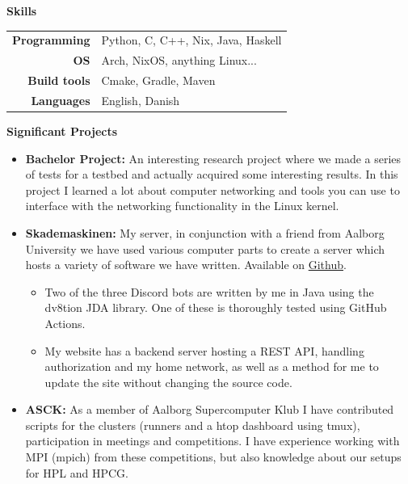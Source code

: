 \documentclass[a4paper, 14pt]{article}
\newcommand{\myitem}[1]{\item[\color{myorange}$\circ$]#1}
\newcommand{\newcvsection}[2]{
    \noindent\huge \textbf{#1} \color{myorange}\hrulefill\color{black}
    
    \normalsize
    #2    
    \vspace{.5cm}
}
\begin{document}
    \newcvsection{Skills}{
        \begin{table}[H]
            \begin{tabular}{rl}
                \textbf{Programming} & Python, C, C++, Nix, Java, Haskell\\
                \textbf{OS} & Arch, NixOS, anything Linux... \\
                \textbf{Build tools} & Cmake, Gradle, Maven \\
                \textbf{Languages} & English, Danish
            \end{tabular}
        \end{table}
    }

    \newcvsection{Significant Projects}{
        \begin{itemize}
            \myitem{
                \textbf{Bachelor Project: } An interesting research project where we made a series of tests for a testbed and actually acquired some interesting results. 
                In this project I learned a lot about computer networking and tools you can use to interface with the networking functionality in the Linux kernel.
            }
            \myitem{
                \textbf{Skademaskinen: } My server, in conjunction with a friend from Aalborg University we have used various computer parts to create a server which hosts a variety of software we have written.
                Available on \href{https://github.com/Skademaskinen}{Github}.
                \begin{itemize}
                    \myitem{
                        Two of the three Discord bots are written by me in Java using the dv8tion JDA library. One of these is thoroughly tested using GitHub Actions.
                    }
                    \myitem{
                        My website has a backend server hosting a REST API, handling authorization and my home network, as well as a method for me to update the site without changing the source code.
                    }
                \end{itemize}
            }

            \myitem{
                \textbf{ASCK: } As a member of Aalborg Supercomputer Klub I have contributed scripts for the clusters (runners and a htop dashboard using tmux), participation in meetings and competitions. 
                I have experience working with MPI (mpich) from these competitions, but also knowledge about our setups for HPL and HPCG.
            }
        \end{itemize}
    }
    
\end{document}
